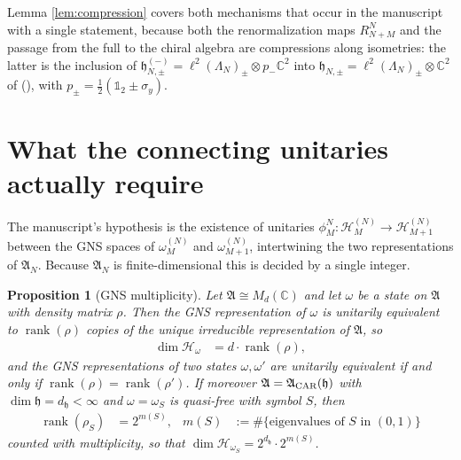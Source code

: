 \documentclass[11pt,a4paper]{article}
\newtheorem{prop}[thm]{Proposition}
\theoremstyle{definition}
\newcommand{\fA}{\mathfrak{A}}
\newcommand{\fh}{\mathfrak{h}}
\newcommand{\cH}{\mathcal{H}}
\newcommand{\1}{\mathds{1}}
\newcommand{\CAR}{\textup{CAR}}
\newcommand{\rank}{\operatorname{rank}}
\newcommand{\ltwo}{\ell^{2}}
\newcommand{\C}{\mathbb{C}}
\begin{document}
Lemma \ref{lem:compression} covers both mechanisms that occur in the manuscript with a single
statement, because both the renormalization maps $R^{N}_{N+M}$ and the passage from the full to the
chiral algebra are compressions along isometries: the latter is the inclusion of
$\fh^{(-)}_{N,\pm}=\ltwo(\Lambda_{N})_{\pm}\otimes p_{-}\C^{2}$ into
$\fh_{N,\pm}=\ltwo(\Lambda_{N})_{\pm}\otimes\C^{2}$ of (\mrChiral), with $p_{\pm}=\tfrac{1}{2}(\1_{2}\pm\sigma_{y})$.

\section{What the connecting unitaries actually require}
\label{sec:gns}

The manuscript's hypothesis is the existence of unitaries
$\phi^{N}_{M}:\cH^{(N)}_{M}\rightarrow\cH^{(N)}_{M+1}$ between the GNS spaces of $\omega^{(N)}_{M}$
and $\omega^{(N)}_{M+1}$, intertwining the two representations of $\fA_{N}$. Because $\fA_{N}$ is
finite-dimensional this is decided by a single integer.

\begin{prop}[GNS multiplicity]
\label{prop:gns}
Let $\fA\cong M_{d}(\C)$ and let $\omega$ be a state on $\fA$ with density matrix $\rho$. Then the
GNS representation of $\omega$ is unitarily equivalent to $\rank(\rho)$ copies of the unique
irreducible representation of $\fA$, so
\begin{align}
\label{eq:gnsdim}
\dim\cH_{\omega} & = d\cdot\rank(\rho),
\end{align}
and the GNS representations of two states $\omega,\omega'$ are unitarily equivalent if and only if
$\rank(\rho)=\rank(\rho')$. If moreover $\fA=\fA_{\CAR}(\fh)$ with $\dim\fh=d_{\fh}<\infty$ and
$\omega=\omega_{S}$ is quasi-free with symbol $S$, then
\begin{align}
\label{eq:qfrank}
\rank(\rho_{S}) & = 2^{m(S)}, & m(S) & := \#\{\text{eigenvalues of }S\text{ in }(0,1)\}
\end{align}
counted with multiplicity, so that $\dim\cH_{\omega_{S}}=2^{d_{\fh}}\cdot2^{m(S)}$.
\end{prop}
\end{document}
